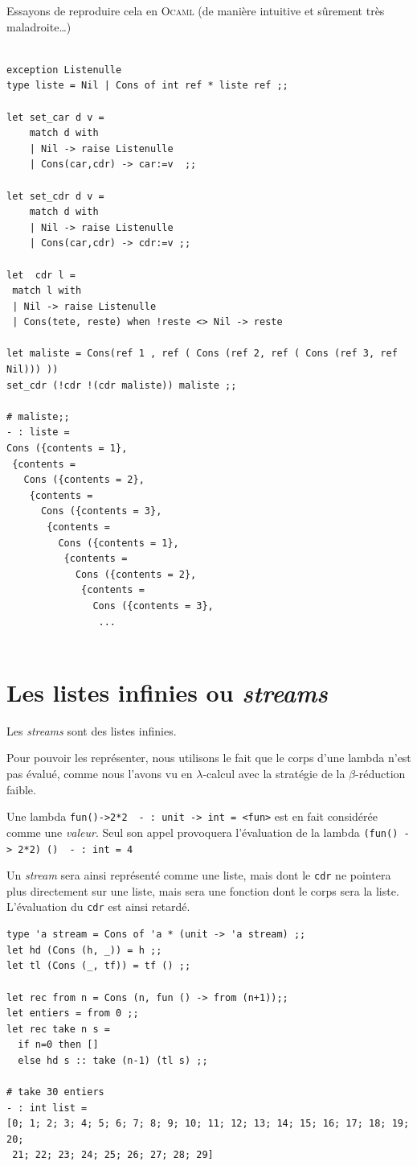 Essayons de reproduire cela en \textsc{Ocaml}
(de manière intuitive et sûrement très maladroite\ldots)
\begin{Verbatim}

exception Listenulle
type liste = Nil | Cons of int ref * liste ref ;;

let set_car d v =
	match d with
	| Nil -> raise Listenulle
	| Cons(car,cdr) -> car:=v  ;;
	
let set_cdr d v =
	match d with
	| Nil -> raise Listenulle
	| Cons(car,cdr) -> cdr:=v ;;
	
let  cdr l =
 match l with
 | Nil -> raise Listenulle
 | Cons(tete, reste) when !reste <> Nil -> reste

let maliste = Cons(ref 1 , ref ( Cons (ref 2, ref ( Cons (ref 3, ref Nil))) ))
set_cdr (!cdr !(cdr maliste)) maliste ;;

# maliste;;
- : liste =
Cons ({contents = 1},
 {contents =
   Cons ({contents = 2},
    {contents =
      Cons ({contents = 3},
       {contents =
         Cons ({contents = 1},
          {contents =
            Cons ({contents = 2},
             {contents =
               Cons ({contents = 3},
               	...
               	
\end{Verbatim}

\section{Les listes infinies ou \textit{streams}}	
Les \textit{streams} sont des listes infinies.

Pour pouvoir les représenter, nous utilisons le fait que le corps d'une lambda n'est pas évalué, 
comme nous l'avons vu en $\lambda$-calcul avec la
stratégie de la $\beta$-réduction faible.


Une lambda \verb+fun()->2*2+\ \imp\ \verb+- : unit -> int = <fun>+ est en fait considérée 
comme une \textit{valeur}. Seul son appel provoquera l'évaluation de la lambda
\verb+(fun() -> 2*2) ()+\ \imp\  \verb+- : int = 4+

Un \textit{stream} sera ainsi représenté comme une liste, mais dont le \verb+cdr+ ne pointera plus directement 
sur une liste, mais sera une fonction dont le corps sera la liste. L'évaluation du \verb+cdr+ est ainsi retardé.
 
\begin{Verbatim}
type 'a stream = Cons of 'a * (unit -> 'a stream) ;;
let hd (Cons (h, _)) = h ;;
let tl (Cons (_, tf)) = tf () ;;

let rec from n = Cons (n, fun () -> from (n+1));;
let entiers = from 0 ;;
let rec take n s =
  if n=0 then []
  else hd s :: take (n-1) (tl s) ;;

# take 30 entiers
- : int list =
[0; 1; 2; 3; 4; 5; 6; 7; 8; 9; 10; 11; 12; 13; 14; 15; 16; 17; 18; 19; 20;
 21; 22; 23; 24; 25; 26; 27; 28; 29]
\end{Verbatim}

